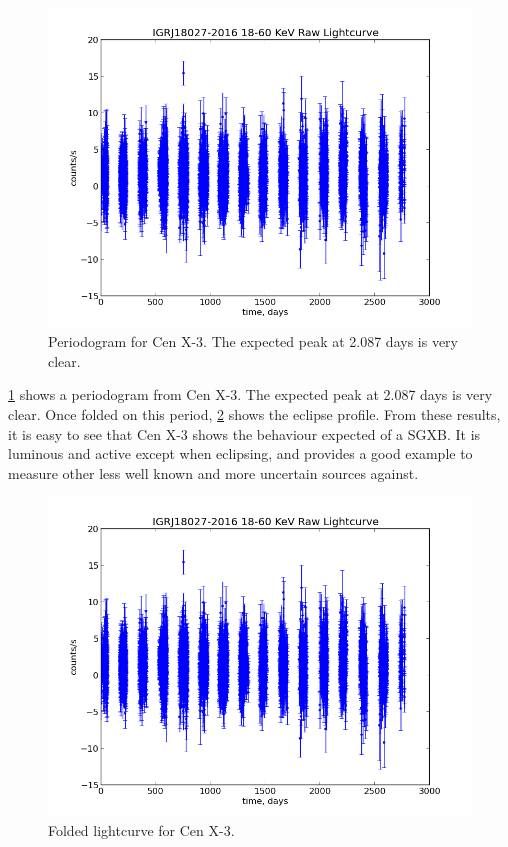 \begin{figure}[h!]
\centering
\includegraphics[width=130mm]{gfx/Fig1.png}
\caption{Periodogram for Cen X-3. The expected peak at 2.087 days is very clear.}
\label{Figure 7}
\end{figure}

\ref{Figure 7} shows a periodogram from Cen X-3. The expected peak at 2.087 days is very clear. Once folded on this period, \ref{Figure 8} shows the eclipse profile. From these results, it is easy to see that Cen X-3 shows the behaviour expected of a SGXB. It is luminous and active except when eclipsing, and provides a good example to measure other less well known and more uncertain sources against. 

\begin{figure}[h!]
\centering
\includegraphics[width=130mm]{gfx/Fig1.png}
\caption{Folded lightcurve for Cen X-3.}
\label{Figure 8}
\end{figure} 
